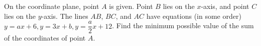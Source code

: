 On the coordinate plane, point $A$ is given. Point $B$ lies on the $x$-axis, and point $C$ lies on the $y$-axis. The lines $AB$, $BC$, and $AC$ have equations (in some order) $y=ax+6, y=3x+b, y=\dfrac{a}{2}x+12$. Find the minimum possible value of the sum of the coordinates of point $A$.
